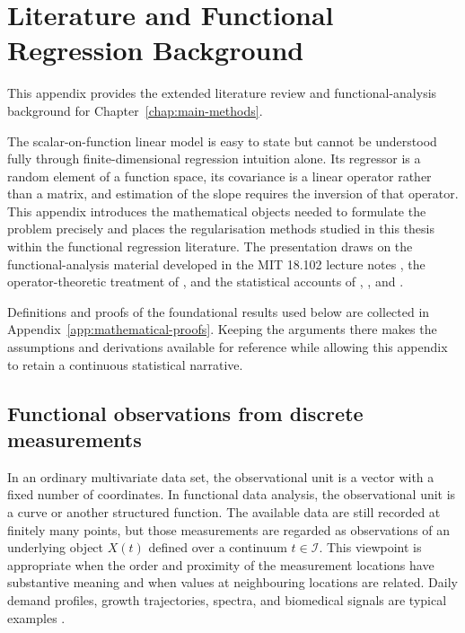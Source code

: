 \chapter{Literature and Functional Regression Background}
\label{chap:background}

This appendix provides the extended literature review and functional-analysis background for
Chapter~\ref{chap:main-methods}.

The scalar-on-function linear model is easy to state but cannot be understood fully through finite-dimensional regression intuition alone. Its regressor is a random element of a function space, its covariance is a linear operator rather than a matrix, and estimation of the slope requires the inversion of that operator. This appendix introduces the mathematical objects needed to formulate the problem precisely and places the regularisation methods studied in this thesis within the functional regression literature. The presentation draws on the functional-analysis material developed in the MIT 18.102 lecture notes \parencite{lin_mit_18102_2021}, the operator-theoretic treatment of \textcite{hsing_eubank_2015}, and the statistical accounts of \textcite{ramsay_silverman_2005}, \textcite{horvath_kokoszka_2012}, and \textcite{kokoszka_reimherr_2017}.

Definitions and proofs of the foundational results used below are collected
in Appendix~\ref{app:mathematical-proofs}.  Keeping the arguments there makes
the assumptions and derivations available for reference while allowing this
appendix to retain a continuous statistical narrative.

\section{Functional observations from discrete measurements}
\label{sec:functional-observations}

In an ordinary multivariate data set, the observational unit is a vector with a fixed number of coordinates. In functional data analysis, the observational unit is a curve or another structured function. The available data are still recorded at finitely many points, but those measurements are regarded as observations of an underlying object $X(t)$ defined over a continuum $t\in\mathcal I$. This viewpoint is appropriate when the order and proximity of the measurement locations have substantive meaning and when values at neighbouring locations are related. Daily demand profiles, growth trajectories, spectra, and biomedical signals are typical examples \parencite{ramsay_silverman_2005,kokoszka_reimherr_2017}.

